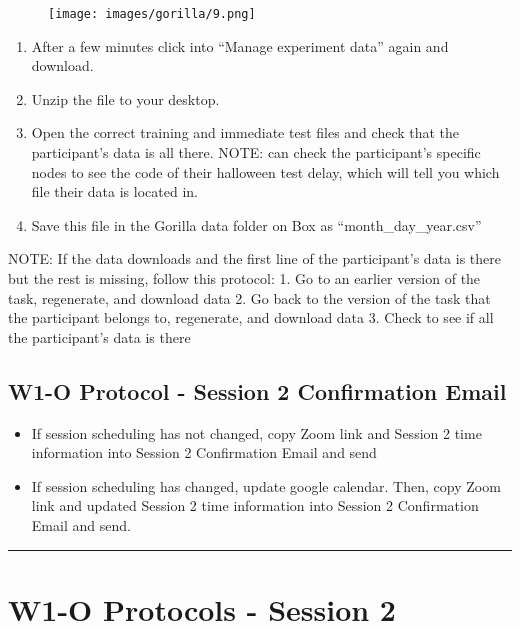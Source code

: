 \documentclass[
]{book}
\providecommand{\tightlist}{%
  \setlength{\itemsep}{0pt}\setlength{\parskip}{0pt}}
\begin{document}
\begin{figure}
\centering
\texttt{[image: images/gorilla/9.png]}
\caption{}
\end{figure}

\begin{enumerate}
\def\labelenumi{\arabic{enumi}.}
\setcounter{enumi}{5}
\tightlist
\item
  After a few minutes click into ``Manage experiment data'' again and download.
\item
  Unzip the file to your desktop.
\item
  Open the correct training and immediate test files and check that the participant's data is all there. NOTE: can check the participant's specific nodes to see the code of their halloween test delay, which will tell you which file their data is located in.
\item
  Save this file in the Gorilla data folder on Box as ``month\_day\_year.csv''
\end{enumerate}

NOTE: If the data downloads and the first line of the participant's data is there but the rest is missing, follow this protocol:
1. Go to an earlier version of the task, regenerate, and download data
2. Go back to the version of the task that the participant belongs to, regenerate, and download data
3. Check to see if all the participant's data is there

\hypertarget{w1-o-protocol---session-2-confirmation-email}{%
\subsection{W1-O Protocol - Session 2 Confirmation Email}\label{w1-o-protocol---session-2-confirmation-email}}

\begin{itemize}
\tightlist
\item
  If session scheduling has not changed, copy Zoom link and Session 2 time information into Session 2 Confirmation Email and send
\item
  If session scheduling has changed, update google calendar. Then, copy Zoom link and updated Session 2 time information into Session 2 Confirmation Email and send.
\end{itemize}

\begin{center}\rule{0.5\linewidth}{0.5pt}\end{center}

\hypertarget{w1-o-protocols---session-2}{%
\section{W1-O Protocols - Session 2}\label{w1-o-protocols---session-2}}
\end{document}
